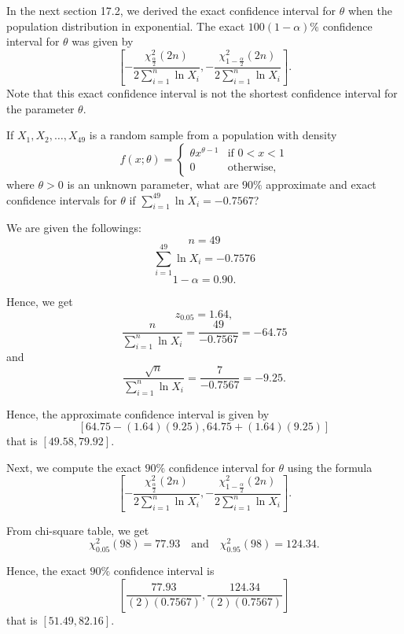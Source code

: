 \begin{solution}
    \begin{remark}[Remark 17.7]
        In the next section 17.2, we derived the exact confidence interval for $\theta$ when the population distribution in exponential. The exact $100(1 - \alpha)\%$ confidence interval for $\theta$ was given by
        \[
            \left[-\frac{\chi^2_{\frac{\alpha}{2}}(2n)}{2\sum_{i=1}^n \ln X_i}, -\frac{\chi^2_{1-\frac{\alpha}{2}}(2n)}{2\sum_{i=1}^n \ln X_i}\right].
        \]
        Note that this exact confidence interval is not the shortest confidence interval for the parameter $\theta$.
    \end{remark}
\end{solution}

\begin{example}
    If $X_1, X_2, \ldots, X_{49}$ is a random sample from a population with density
    \[
        f(x; \theta) = \begin{cases}
            \theta x^{\theta - 1} & \text{if } 0 < x < 1\\
            0 & \text{otherwise,}
        \end{cases}
    \]
    where $\theta > 0$ is an unknown parameter, what are $90\%$ approximate and exact confidence intervals for $\theta$ if $\sum_{i=1}^{49} \ln X_i = -0.7567$?
\end{example}
\begin{solution}
    We are given the followings:
    \[
        n = 49
    \]
    \[
        \sum_{i=1}^{49} \ln X_i = -0.7576
    \]
    \[
        1 - \alpha = 0.90.
    \]

    Hence, we get
    \[
        z_{0.05} = 1.64,
    \]
    \[
        \frac{n}{\sum_{i=1}^n \ln X_i} = \frac{49}{-0.7567} = -64.75
    \]
    and
    \[
        \frac{\sqrt{n}}{\sum_{i=1}^n \ln X_i} = \frac{7}{-0.7567} = -9.25.
    \]

    Hence, the approximate confidence interval is given by
    \[
        [64.75 - (1.64)(9.25), 64.75 + (1.64)(9.25)]
    \]
    that is $[49.58, 79.92]$.

    Next, we compute the exact $90\%$ confidence interval for $\theta$ using the formula
    \[
        \left[-\frac{\chi^2_{\frac{\alpha}{2}}(2n)}{2\sum_{i=1}^n \ln X_i}, -\frac{\chi^2_{1-\frac{\alpha}{2}}(2n)}{2\sum_{i=1}^n \ln X_i}\right].
    \]

    From chi-square table, we get
    \[
        \chi^2_{0.05}(98) = 77.93 \quad \text{and} \quad \chi^2_{0.95}(98) = 124.34.
    \]

    Hence, the exact $90\%$ confidence interval is
    \[
        \left[\frac{77.93}{(2)(0.7567)}, \frac{124.34}{(2)(0.7567)}\right]
    \]
    that is $[51.49, 82.16]$.
\end{solution}

